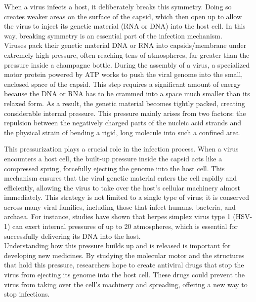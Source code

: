 \documentclass[12pt]{article}
\begin{document}
\begin{flushleft}
When a virus infects a host, it deliberately breaks this symmetry. Doing so creates weaker areas on the surface of the capsid, which then open up to allow the virus to inject its genetic material (RNA or DNA) into the host cell. In this way, breaking symmetry is an essential part of the infection mechanism.\\




Viruses pack their genetic material DNA or RNA into capsids/membrane under extremely high pressure, often reaching tens of atmospheres, far greater than the pressure inside a champagne bottle. During the assembly of a virus, a specialized motor protein powered by ATP works to push the viral genome into the small, enclosed space of the capsid. This step requires a significant amount of energy because the DNA or RNA has to be crammed into a space much smaller than its relaxed form. As a result, the genetic material becomes tightly packed, creating considerable internal pressure. This pressure mainly arises from two factors: the repulsion between the negatively charged parts of the nucleic acid strands and the physical strain of bending a rigid, long molecule into such a confined area.\cite{BrandarizNunez2019}




This pressurization plays a crucial role in the infection process. When a virus encounters a host cell, the built-up pressure inside the capsid acts like a compressed spring, forcefully ejecting the genome into the host cell. This mechanism ensures that the viral genetic material enters the cell rapidly and efficiently, allowing the virus to take over the host’s cellular machinery almost immediately. This strategy is not limited to a single type of virus; it is conserved across many viral families, including those that infect humans, bacteria, and archaea. For instance, studies have shown that herpes simplex virus type 1 (HSV-1) can exert internal pressures of up to 20 atmospheres, which is essential for successfully delivering its DNA into the host\cite{BrandarizNunez2019}.\\




Understanding how this pressure builds up and is released is important for developing new medicines. By studying the molecular motor and the structures that hold this pressure, researchers hope to create antiviral drugs that stop the virus from ejecting its genome into the host cell. These drugs could prevent the virus from taking over the cell’s machinery and spreading, offering a new way to stop infections.




\end{flushleft}
\end{document}
